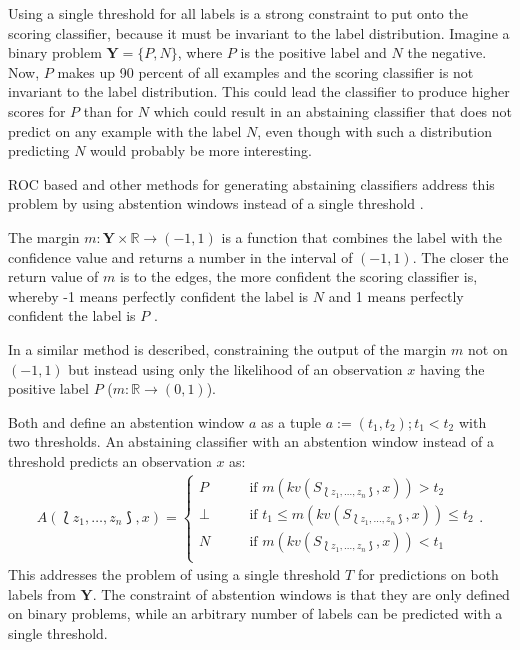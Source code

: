 \documentclass[twoside,11pt]{article}
\def\ds{\Lbag z_1,\dots,z_n \Rbag}
\def\Y{\textbf{Y}}
\begin{document}
Using a single threshold for all labels is a strong
constraint to put onto the scoring classifier, because it
must be invariant to the label distribution.
Imagine a binary problem $\textbf{Y} = \{P, N\}$, where
$P$ is the positive label and $N$ the negative.
Now, $P$ makes up 90 percent of all examples and the
scoring classifier is not invariant to the label
distribution.
This could lead the classifier to produce higher scores for
$P$ than for $N$ which could result in an abstaining
classifier that does not predict on any example with the
label $N$, even though with such a distribution predicting
$N$ would probably be more interesting.

ROC based and other methods for generating abstaining
classifiers address this problem by using abstention
windows instead of a single threshold
\citep[see][]{friedel_et_al_2006}.

The margin $m: \Y \times \mathbb{R} \rightarrow (-1,1)$ is
a function that combines the label with the confidence
value and returns a number in the interval of $(-1,1)$.
The closer the return value of $m$ is to the edges, the
more confident the scoring classifier is, whereby -1 means
perfectly confident the label is $N$ and 1 means perfectly
confident the label is $P$
\citep[see][]{friedel_et_al_2006}.

In \citet{guan_et_al_2018} a similar method is described,
constraining the output of the margin $m$ not on $(-1,1)$
but instead using only the likelihood of an observation $x$
having the positive label $P$
($m: \mathbb{R} \rightarrow (0,1)$).

Both \citet{friedel_et_al_2006} and \citet{guan_et_al_2018}
define an abstention window $a$ as a tuple
$a := (t_1, t_2); t_1 < t_2$ with two thresholds.
An abstaining classifier with an abstention window
instead of a threshold predicts an observation $x$ as:
\begin{align*}
  A(\ds, x) =
    \begin{cases}
      P    &\qquad \text{if } m(kv(S_{\ds}, x)) > t_2 \\
      \bot &\qquad \text{if }
            t_1 \leq m(kv(S_{\ds}, x)) \leq t_2 \\
      N    &\qquad \text{if } m(kv(S_{\ds}, x)) < t_1 \\
    \end{cases}.
\end{align*}
This addresses the problem of using a single threshold $T$
for predictions on both labels from $\Y$.
The constraint of abstention windows is that they are only
defined on binary problems, while an arbitrary number of
labels can be predicted with a single threshold.
\end{document}
